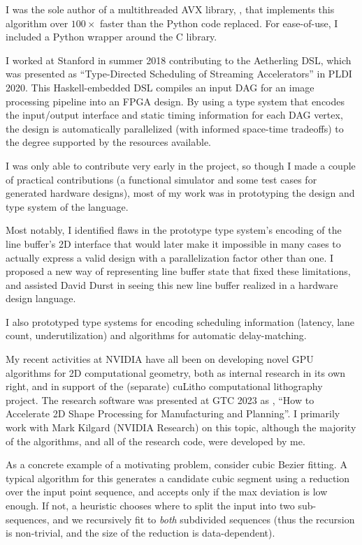 I was the sole author of a multithreaded AVX
library, ,
that implements this algorithm over $100\times$ faster than the Python
code replaced. For ease-of-use, I included a Python wrapper around the
C library.

I worked at Stanford in summer 2018 contributing to the Aetherling
DSL, which was presented as ``Type-Directed Scheduling of Streaming
Accelerators'' in PLDI 2020. This Haskell-embedded DSL compiles an
input DAG for an image processing pipeline into an FPGA design. By
using a type system that encodes the input/output interface and static
timing information for each DAG vertex, the design is automatically
parallelized (with informed space-time tradeoffs) to the degree
supported by the resources available.

I was only able to contribute very early in the project, so though I
made a couple of practical contributions (a functional simulator and
some test cases for generated hardware designs), most of my work was in
prototyping the design and type system of the language.

Most notably, I identified flaws in the prototype type system's
encoding of the line buffer's 2D interface that would later make it
impossible in many cases to actually express a valid design with a
parallelization factor other than one. I proposed a new way of
representing line buffer state that fixed these limitations, and
assisted David Durst in seeing this new line buffer realized in a
hardware design language.

I also prototyped type systems for encoding scheduling information
(latency, lane count, underutilization) and algorithms for automatic
delay-matching.

\filbreak

My recent activities at NVIDIA have all been on developing novel GPU
algorithms for 2D computational geometry, both as internal research in
its own right, and in support of the (separate) cuLitho computational
lithography project. The research software was presented at GTC 2023
as
, ``How to Accelerate 2D Shape Processing for Manufacturing and
Planning''. I primarily work with Mark Kilgard (NVIDIA Research) on
this topic, although the majority of the algorithms, and all of the
research code, were developed by me.

As a concrete example of a motivating problem, consider cubic Bezier
fitting. A typical algorithm for this generates a candidate cubic
segment using a reduction over the input point sequence, and accepts
only if the max deviation is low enough. If not, a heuristic chooses
where to split the input into two sub-sequences, and we recursively
fit to \textit{both} subdivided sequences (thus the recursion is
non-trivial, and the size of the reduction is data-dependent).

